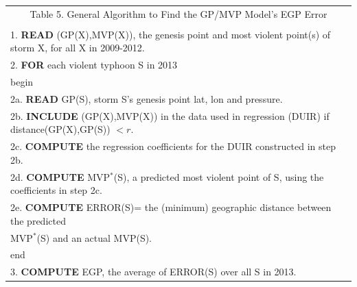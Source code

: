 \documentclass[a4paper, 12pt]{article}
\begin{document}
{\begin{table}[!htpb]
\scriptsize
\begin{center}
\begin{tabular}{|l|}
\multicolumn{1}{c}{{\small Table 5. General Algorithm to Find the  GP/MVP Model's EGP Error}}\\
\multicolumn{1}{c}{}\\\hline
 \multicolumn{1}{|m{5in}|}{ 1. {\bf READ} (GP(X),MVP(X)),  the genesis point and most violent point(s) of  storm X, for all X in 2009-2012.}\\
  2. {\bf FOR} each violent typhoon S in 2013\\
     \hspace{.25in} begin\\
\hspace{.5in} 2a. {\bf READ} GP(S), storm S's genesis point lat, lon and pressure.\\
 \hspace{.5in} 2b. {\bf  INCLUDE}  (GP(X),MVP(X)) in the data used in regression (DUIR) if distance(GP(X),GP(S)) $< r$.\\
  \hspace{.5in} 2c. {\bf  COMPUTE} the regression coefficients for the DUIR constructed in step 2b.\\
\hspace{.5in}  2d. {\bf  COMPUTE} MVP$^*$(S),  a predicted most violent point of S, using the coefficients in step 2c.\\
   \multicolumn{1}{|m{5in}|}{\hspace{.5in} 2e. {\bf COMPUTE} ERROR(S)= the (minimum) geographic distance between the predicted}\\
    \multicolumn{1}{|m{5in}|}{\hspace{.75in}  MVP$^*$(S) and an actual MVP(S).}\\
    \hspace{.25in} end\\
\multicolumn{1}{|m{5in}|}{3. {\bf COMPUTE} EGP, the average of ERROR(S) over all S in 2013.}\\\hline
\end{tabular}
\end{center}
\vspace{5in}
\end{table}






\newpage


}
\end{document}
